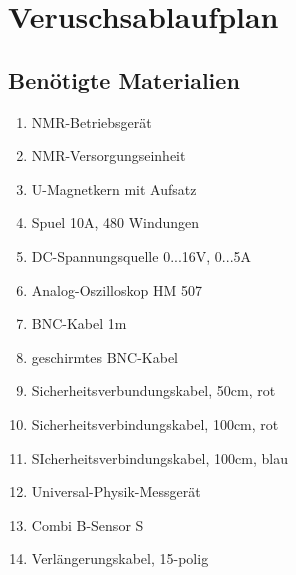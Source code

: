 \documentclass{article}
\begin{document}
\newpage

\section{Veruschsablaufplan}

\subsection{Benötigte Materialien}
    \begin{enumerate}[label=\arabic*.]
        \item NMR-Betriebsgerät
        \item NMR-Versorgungseinheit
        \item U-Magnetkern mit Aufsatz
        \item Spuel 10A, 480 Windungen
        \item DC-Spannungsquelle 0...16V, 0...5A
        \item Analog-Oszilloskop HM 507
        \item BNC-Kabel 1m
        \item geschirmtes BNC-Kabel
        \item Sicherheitsverbundungskabel, 50cm, rot
        \item Sicherheitsverbindungskabel, 100cm, rot
        \item SIcherheitsverbindungskabel, 100cm, blau
        \item Universal-Physik-Messgerät
        \item Combi B-Sensor S
        \item Verlängerungskabel, 15-polig
    \end{enumerate}

\newpage
\end{document}
